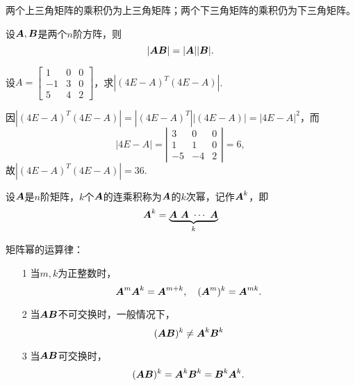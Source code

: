 \begin{frame}
\begin{jielun}
  两个上三角矩阵的乘积仍为上三角矩阵；两个下三角矩阵的乘积仍为下三角矩阵。
\end{jielun}
\end{frame}

\begin{frame}
\begin{dingli}
  设$\boldsymbol{A},\boldsymbol{B}$是两个$n$阶方阵，则
  $$
  |\boldsymbol{A}\boldsymbol{B}| = |\boldsymbol{A}||\boldsymbol{B}|.
  $$
\end{dingli}
\end{frame}

\begin{frame}
\begin{li}
  设$A=\left[
    \begin{array}{rrr}
      1&0&0\\
      -1&3&0\\
      5&4&2
    \end{array}
  \right]$，求$|(4E-A)^T(4E-A)|$.
\end{li}
\pause
\begin{jie}
  因$|(4E-A)^T(4E-A)|=|(4E-A)^T||(4E-A)|=|4E-A|^2$，而
  $$
  |4E-A|=\left|
    \begin{array}{rrr}
      3&0&0\\
      1&1&0\\
      -5&-4&2
    \end{array}
  \right|=6,
  $$
  故$|(4E-A)^T(4E-A)|=36.$
\end{jie}
\end{frame}

\begin{frame}
\begin{dingyi}[矩阵幂]
  设$\boldsymbol{A}$是$n$阶矩阵，$k$个$\boldsymbol{A}$的连乘积称为$\boldsymbol{A}$的$k$次幂，记作$\boldsymbol{A}^k$，即
  $$
  \boldsymbol{A}^k = \underbrace{\boldsymbol{A}~ \boldsymbol{A}~ \cdots ~\boldsymbol{A}}_{k}
  $$
\end{dingyi}

矩阵幂的运算律：
\begin{itemize}
\item[1] 当$m,k$为正整数时，
  $$
  \boldsymbol{A}^m \boldsymbol{A}^k = \boldsymbol{A}^{m+k}, \quad
  (\boldsymbol{A}^m)^k = \boldsymbol{A}^{mk}.
  $$  
\item[2]
  当$\boldsymbol{A}\boldsymbol{B}$不可交换时，一般情况下，
  $$
  (\boldsymbol{A}\boldsymbol{B})^k \ne \boldsymbol{A}^k\boldsymbol{B}^k 
  $$  
\item[3]
  当$\boldsymbol{A}\boldsymbol{B}$可交换时，
  $$
  (\boldsymbol{A}\boldsymbol{B})^k = \boldsymbol{A}^k\boldsymbol{B}^k =  \boldsymbol{B}^k\boldsymbol{A}^k. 
  $$
\end{itemize}

\end{frame}

